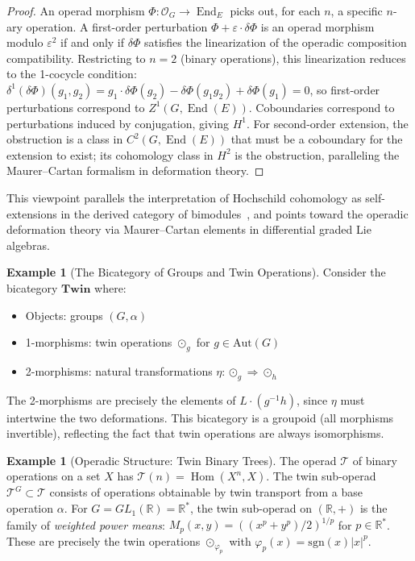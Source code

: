 \documentclass[11pt,a4paper,openany]{book}
\theoremstyle{plain}
\theoremstyle{definition}
\newtheorem{example}[theorem]{Example}
\newcommand{\twing}[1]{\odot_{#1}}
\newcommand{\lingroup}{L}
\newcommand{\actspace}{E}
\newcommand{\groupG}{G}
\newcommand{\RR}{\mathbb{R}}
\newcommand{\Aut}{\mathrm{Aut}}
\DeclareMathOperator{\End}{End}
\DeclareMathOperator{\Hom}{Hom}
\begin{document}
\begin{proof}
An operad morphism $\Phi : \mathcal{O}_\groupG \to \End_\actspace$ picks out, for each $n$, a specific $n$-ary operation. A first-order perturbation $\Phi + \varepsilon \cdot \delta\Phi$ is an operad morphism modulo $\varepsilon^2$ if and only if $\delta\Phi$ satisfies the linearization of the operadic composition compatibility. Restricting to $n = 2$ (binary operations), this linearization reduces to the 1-cocycle condition: $\delta^1(\delta\Phi)(g_1, g_2) = g_1 \cdot \delta\Phi(g_2) - \delta\Phi(g_1 g_2) + \delta\Phi(g_1) = 0$, so first-order perturbations correspond to $Z^1(\groupG, \End(\actspace))$. Coboundaries correspond to perturbations induced by conjugation, giving $H^1$. For second-order extension, the obstruction is a class in $C^2(\groupG, \End(\actspace))$ that must be a coboundary for the extension to exist; its cohomology class in $H^2$ is the obstruction, paralleling the Maurer--Cartan formalism in deformation theory.
\end{proof}

This viewpoint parallels the interpretation of Hochschild cohomology as self-extensions in the derived category of bimodules~\cite{weibel1994}, and points toward the operadic deformation theory via Maurer--Cartan elements in differential graded Lie algebras.



\begin{example}[The Bicategory of Groups and Twin Operations]\label{ex:bicat-groups}
Consider the bicategory $\mathbf{Twin}$ where:
\begin{itemize}
\item Objects: groups $(G, \alpha)$
\item 1-morphisms: twin operations $\twing{g}$ for $g \in \Aut(G)$
\item 2-morphisms: natural transformations $\eta : \twing{g} \Rightarrow \twing{h}$
\end{itemize}
The 2-morphisms are precisely the elements of $\lingroup \cdot (g^{-1}h)$, since $\eta$ must intertwine the two deformations. This bicategory is a groupoid (all morphisms invertible), reflecting the fact that twin operations are always isomorphisms.
\end{example}

\begin{example}[Operadic Structure: Twin Binary Trees]\label{ex:operad-trees}
The operad $\mathcal{T}$ of binary operations on a set $X$ has $\mathcal{T}(n) = \Hom(X^n, X)$. The twin sub-operad $\mathcal{T}^G \subset \mathcal{T}$ consists of operations obtainable by twin transport from a base operation $\alpha$. For $G = GL_1(\RR) = \RR^*$, the twin sub-operad on $(\RR, +)$ is the family of \emph{weighted power means}: $M_p(x, y) = ((x^p + y^p)/2)^{1/p}$ for $p \in \RR^*$. These are precisely the twin operations $\twing{\varphi_p}$ with $\varphi_p(x) = \mathrm{sgn}(x)|x|^p$.
\end{example}
\end{document}
